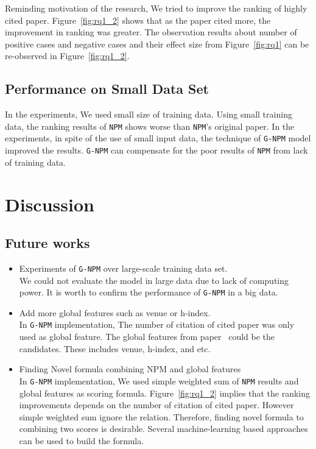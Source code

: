 \documentclass{llncs}
\newcommand{\name}{\texttt{G-NPM}\xspace}
\newcommand{\npm}{\texttt{NPM}\xspace}
\begin{document}
Reminding motivation of the research, We tried to improve the ranking of highly cited paper. Figure~\ref{fig:rq1_2} shows that as the paper cited more, the improvement in ranking was greater.  The observation results about number of positive cases and negative cases and their effect size from Figure~\ref{fig:rq1}  can be re-observed in  Figure~\ref{fig:rq1_2}.


\subsection{Performance on Small Data Set}

In the experiments, We used small size of training data. Using small training data, the ranking results of \npm shows worse than \npm's original paper\cite{Huang:2015:NPM:2886521.2886655}. In the experiments, in spite of the use of small input data, the technique of \name model improved the results. \name can compensate for the poor results  of \npm from lack of training data.


\section{Discussion}


\subsection{Future works}

\begin{itemize}
\item Experiments of \name over large-scale training data set.\\
We could not evaluate the model in large data due to lack of computing power.
It is worth to confirm the performance of \name in a big data.\\

\item Add more global features such as venue or h-index.\\
In \name implementation, The number of citation of cited paper was only used as global feature. The global features from paper~\cite{Bethard:2010:ICL:1871437.1871517} could be the candidates. These includes venue, h-index, and etc.\\

\item Finding Novel formula combining NPM and global features\\
In \name implementation, We used simple weighted sum of \npm results and global features as scoring formula. Figure~\ref{fig:rq1_2} implies that the ranking improvements depends on the number of citation of cited paper. However simple weighted sum ignore the relation. Therefore, finding novel formula to combining two scores is desirable. Several machine-learning based approaches can be used to build the formula.
\end{itemize}
\end{document}
